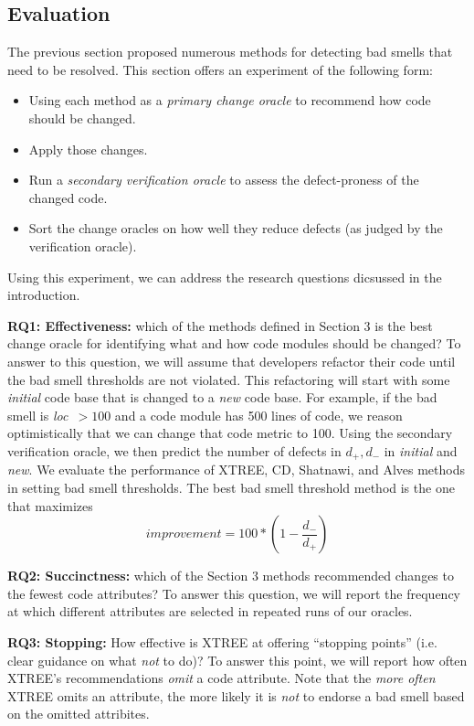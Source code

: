 \documentclass[twocolumn,5p]{elsarticle}
\newcommand{\bi}{\begin{itemize}[leftmargin=0.4cm]}
\newcommand{\ei}{\end{itemize}}
\theoremstyle{break}
\begin{document}
\begin{itemize}
      
\section{Evaluation}
The previous section proposed numerous methods for detecting bad smells that need
to be resolved. This section offers an experiment of the following form:
\bi
\item Using each method as a {\em primary change oracle} to recommend how code should be changed.
\item Apply those changes. 
\item Run a {\em secondary verification oracle} to assess the defect-proness of the changed code.
\item Sort the change oracles on how well they reduce defects (as judged by the verification oracle).
\ei
Using this experiment, we can address the research questions dicsussed in the introduction.

{\bf RQ1: Effectiveness: } which of the methods defined in Section 3 is the best change oracle for identifying what and how code modules should be changed? 
To   answer to this question, we will assume that developers
refactor their code until the bad smell thresholds are not violated.
This refactoring will start with some {\em initial} code
base that is changed to a {\em new} code base. 
For example, if the bad smell is \mbox{{\em loc $>100$}} and a 
code module has 500 lines of code, we reason
optimistically that we can change that code metric
to 100.  
Using the secondary verification oracle,  we then predict the
number of defects in $d_+,d_-$ in {\em initial} and {\em new}. We evaluate the performance of XTREE, CD, Shatnawi, and Alves methods in setting bad smell thresholds.
The best bad smell threshold method is the one that maximizes
\begin{equation}\label{eq:diff}
\mathit{improvement} = 100* \left(1 - \frac{ d_- }{ d_+}\right)
\end{equation}


{\bf RQ2: Succinctness: } which of the Section 3 methods recommended changes to the fewest code attributes?
To answer this question, we will report the frequency at which different attributes are selected in repeated runs of our oracles.

{\bf RQ3: Stopping: }    How effective is XTREE at offering   ``stopping points'' (i.e. clear guidance on what {\em not} to do)?   
To answer this point, we will report how often XTREE's recommendations {\em omit} a code attribute. 
Note that the {\em more often} XTREE omits an attribute, the more likely it is {\em not} to endorse a bad smell based on the omitted
attribites.


\end{itemize}
\end{document}
